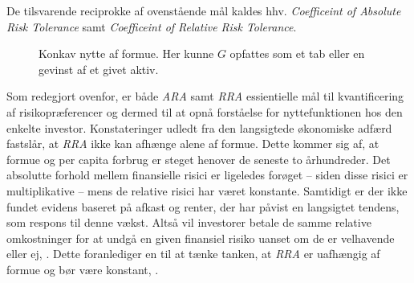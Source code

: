 \documentclass[
  a4paper,
  oneside]{memoir}
\begin{document}
De tilsvarende reciprokke af ovenstående mål kaldes hhv. \emph{Coefficeint of Absolute Risk Tolerance} samt \emph{Coefficeint of Relative Risk Tolerance}.

\begin{figure}[H]
\centering
{}
\caption{Konkav nytte af formue. Her kunne $G$ opfattes som et tab eller en gevinst af et givet aktiv.}
\label{fig:Nyt}
\end{figure}

Som redegjort ovenfor, er både \emph{ARA} samt \emph{RRA} essientielle mål til kvantificering af risikopræferencer og dermed til at opnå forståelse for nyttefunktionen hos den enkelte investor. Konstateringer udledt fra den langsigtede økonomiske adfærd fastslår, at \emph{RRA} ikke kan afhænge alene af formue. Dette kommer sig af, at formue og per capita forbrug er steget henover de seneste to århundreder. Det absolutte forhold mellem finansielle risici er ligeledes forøget -- siden disse risici er multiplikative -- mens de relative risici har været konstante. Samtidigt er der ikke fundet evidens baseret på afkast og renter, der har påvist en langsigtet tendens, som respons til denne vækst. Altså vil investorer betale de samme relative omkostninger for at undgå en given finansiel risiko uanset om de er velhavende eller ej, \citep{CampVic2003}. Dette foranlediger en til at tænke tanken, at \emph{RRA} er uafhængig af formue og bør være konstant, \citep{Chiappori2008}.
\end{document}
